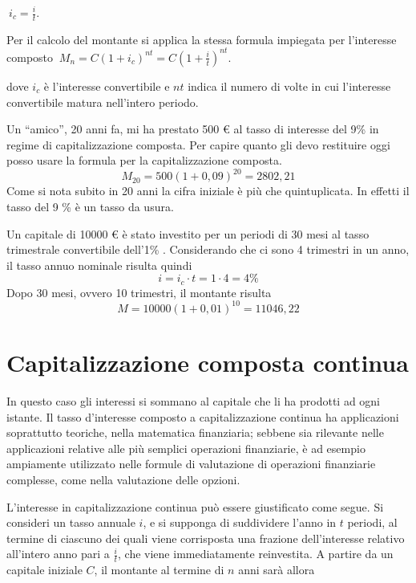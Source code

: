 $\ i_c = \frac{i}{t}$.

Per il calcolo del montante si applica la stessa formula impiegata per 
l'interesse composto
$\ M_n = C (1+i_c)^{nt} = C \left(1+\frac{i}{t}\right)^{nt}$.

dove $i_c$ è l'interesse convertibile e $nt$ indica il numero di volte in cui 
l'interesse convertibile matura nell'intero periodo.

\begin{exrig}
\begin{esempio}
Un ``amico'', 20 anni fa, mi ha prestato 500 € al tasso di interesse del 9\% in 
regime di capitalizzazione composta. Per capire quanto gli devo restituire oggi 
posso usare la formula per la capitalizzazione composta.
$$M_{20} = 500(1+0,09)^{20} = 2802,21$$ 
Come si nota subito in 20 anni la cifra iniziale è più che quintuplicata. In 
effetti il tasso del 9 \% è un tasso da usura. 
\end{esempio}
\begin{esempio}
Un capitale di 10000 € è stato investito per un periodi di 30 mesi al tasso 
trimestrale convertibile dell'1\% . Considerando che ci sono 4 trimestri in un 
anno, il tasso annuo nominale risulta quindi
$$i=i_c\cdot t=1\cdot 4=4\%$$
Dopo 30 mesi, ovvero 10 trimestri, il montante risulta
$$M=10000(1+0,01)^{10}=11046,22$$
\end{esempio}
\end{exrig}

\section{Capitalizzazione composta continua}

In questo caso gli interessi si sommano al capitale che li ha prodotti ad ogni 
istante. Il tasso d'interesse composto a capitalizzazione continua ha 
applicazioni soprattutto teoriche, nella matematica finanziaria; sebbene sia 
rilevante nelle applicazioni relative alle più semplici operazioni finanziarie, 
è ad esempio ampiamente utilizzato nelle formule di valutazione di operazioni 
finanziarie complesse, come nella valutazione delle opzioni.

L'interesse in capitalizzazione continua può essere giustificato come segue. Si 
consideri un tasso annuale $i$, e si supponga di suddividere l'anno in $t$ 
periodi, al termine di ciascuno dei quali viene corrisposta una frazione 
dell'interesse relativo all'intero anno pari a $\frac{i}{t}$, che viene 
immediatamente reinvestita. A partire da un capitale iniziale $C$, il montante 
al termine di $n$ anni sarà allora

